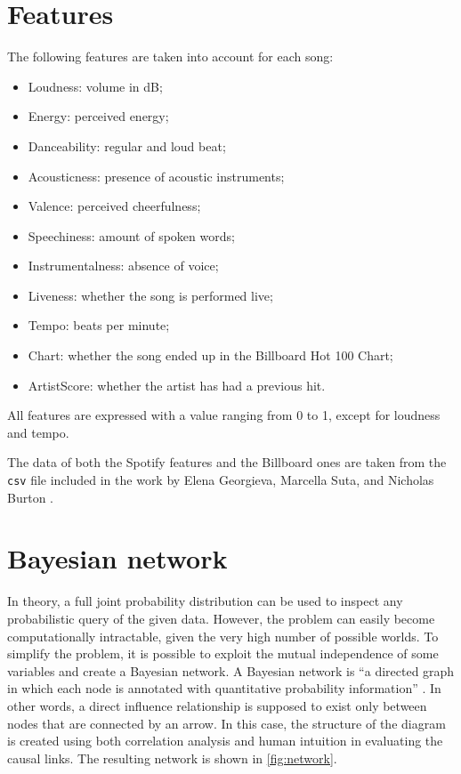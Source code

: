 \documentclass[a4paper, 12pt]{article}
\begin{document}
\section{Features}

The following features are taken into account for each song:
\begin{itemize}
    \item Loudness: volume in dB;
    \item Energy: perceived energy;
    \item Danceability: regular and loud beat;
    \item Acousticness: presence of acoustic instruments;
    \item Valence: perceived cheerfulness;
    \item Speechiness: amount of spoken words;
    \item Instrumentalness: absence of voice;
    \item Liveness: whether the song is performed live;
    \item Tempo: beats per minute;
    \item Chart: whether the song ended up in the Billboard Hot 100 Chart;
    \item ArtistScore: whether the artist has had a previous hit.
\end{itemize}

All features are expressed with a value ranging from 0 to 1, except for loudness and tempo.

The data of both the Spotify features and the Billboard ones are taken from the \verb|csv| file included in the work by Elena Georgieva, Marcella Suta, and Nicholas Burton \cite{hitpredict-presentation, hitpredict-report}.


\section{Bayesian network}

In theory, a full joint probability distribution can be used to inspect any probabilistic query of the given data. However, the problem can easily become computationally intractable, given the very high number of possible worlds. To simplify the problem, it is possible to exploit the mutual independence of some variables and create a Bayesian network. A Bayesian network is ``a directed graph in which each node is annotated with quantitative probability information'' \cite{probabilistic-reasoning}. In other words, a direct influence relationship is supposed to exist only between nodes that are connected by an arrow. In this case, the structure of the diagram is created using both correlation analysis and human intuition in evaluating the causal links. The resulting network is shown in \cref{fig:network}.
\end{document}
